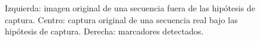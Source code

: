 \begin{figure}[ht!]
{        \label{abeldetect}}
      \caption{%
       Izquierda: imagen original de una secuencia fuera de las hipótesis de captura. 
       Centro: captura original de una secuencia real bajo las hipótesis de captura.
        Derecha: marcadores detectados.}  
      \label{ejemploabelumbr2}
\end{figure}
